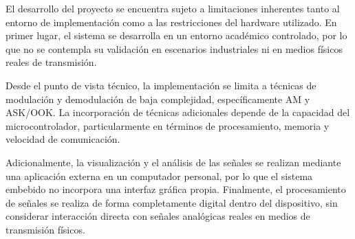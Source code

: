 El desarrollo del proyecto se encuentra sujeto a limitaciones inherentes tanto al entorno de implementación como a las restricciones del hardware utilizado. En primer lugar, el sistema se desarrolla en un entorno académico controlado, por lo que no se contempla su validación en escenarios industriales ni en medios físicos reales de transmisión.

Desde el punto de vista técnico, la implementación se limita a técnicas de modulación y demodulación de baja complejidad, específicamente AM y ASK/OOK. La incorporación de técnicas adicionales depende de la capacidad del microcontrolador, particularmente en términos de procesamiento, memoria y velocidad de comunicación.

Adicionalmente, la visualización y el análisis de las señales se realizan mediante una aplicación externa en un computador personal, por lo que el sistema embebido no incorpora una interfaz gráfica propia. Finalmente, el procesamiento de señales se realiza de forma completamente digital dentro del dispositivo, sin considerar interacción directa con señales analógicas reales en medios de transmisión físicos.
